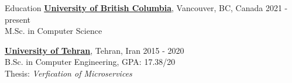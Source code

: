 \documentclass{resume} %
\begin{document}
	

\begin{rSection}{Education}
	{\bf \href{https://www.ubc.ca/}{University of British Columbia}}, Vancouver, BC, Canada
        \hfill 2021 - present
	\\M.Sc. in Computer Science
	
	{\bf \href{http://ut.ac.ir/en}{University of Tehran}}, Tehran, Iran \hfill 2015 - 2020 
	\\B.Sc. in Computer Engineering, GPA: 17.38/20 
    \\Thesis: \textit{Verfication of Microservices}
\end{rSection}

\end{document}
